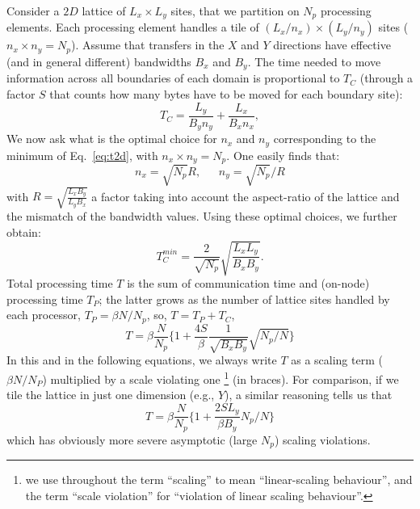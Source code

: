 \documentclass{elsarticle}
\begin{document}
Consider a $2D$ lattice of $L_x \times L_y$ sites, that we partition on 
$N_p$ processing elements. 
%
Each processing element handles a tile of $(L_x/n_x) \times (L_y/n_y)$ sites 
($n_x \times n_y = N_p$). 
%
Assume that transfers in the $X$ and $Y$ directions have effective (and in general different) 
bandwidths $B_x$ and $B_y$.
%
The time needed to move information across all boundaries of each domain
is proportional to $T_ {C}$ (through a factor $S$ that counts how many 
bytes have to be moved for each boundary site):
%
\begin{equation}
T_ {C} = \frac{L_y}{B_y n_y} + \frac{L_x}{B_x n_x},
\label{eq:t2d}
\end{equation}
%
We now ask what is the optimal choice for $n_x$ and $n_y$ corresponding 
to the minimum of Eq.~\ref{eq:t2d}, with  $n_x \times n_y = N_p$. 
%
One easily finds that:
%
\begin{equation}
n_x  =  \sqrt{N_p} R, ~~~~~~~ n_y = \sqrt{N_p} / R
\label{eq:bestn}
\end{equation} 
%
with $R = \sqrt{\frac{L_x B_y}{L_y B_x}}$ a factor taking into 
account the aspect-ratio of the lattice
and the mismatch of the bandwidth values. Using these optimal choices, 
we further obtain: 
%
\begin{equation}
T_{C}^{min} = \frac{2}{\sqrt{N_p}} \sqrt{ \frac{L_x L_y}{B_x B_y} }.
\label{eq:t2dmin}
\end{equation}
%
Total processing time $T$ is the sum of communication time and (on-node) processing 
time $T_P$; the latter grows as the number of lattice sites handled by each processor, 
$T_P = \beta  N/N_p$, so, $T = T_P + T_C$,
\begin{equation}
T = \beta \frac{N}{N_p} \{1 + \frac{4S}{\beta} \frac{1}{\sqrt{B_x B_y}}\sqrt{N_p/N}\}
\label{eq:tot2d}
\end{equation}
%
In this and in the following equations, we always write $T$ as a scaling term 
($\beta N/N_P$) multiplied by a scale violating one 
\footnote{we use throughout the term ``scaling'' to mean ``linear-scaling behaviour'', 
and the term ``scale violation'' for ``violation of linear scaling behaviour''.} (in braces). 
For comparison, if we tile the lattice in just one dimension (e.g., $Y$), 
a similar reasoning tells us that
%
\begin{equation}
T = \beta \frac{N}{N_p} \{1 + \frac{2SL_y}{\beta B_y} N_p/N\}
\label{eq:tot1d}
\end{equation}
%
which has obviously more severe asymptotic (large $N_p$) scaling violations. 
\end{document}

